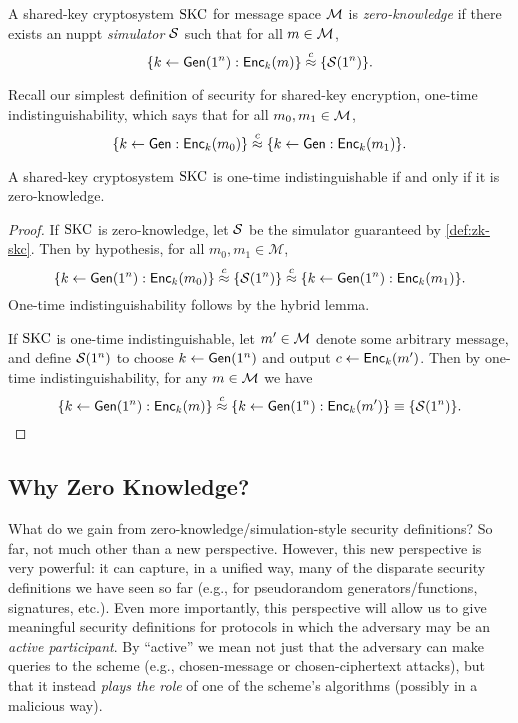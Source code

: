 \documentclass[11pt]{article}
\begin{document}
\begin{definition}
  \label{def:zk-skc}
  A shared-key cryptosystem $\text{SKC}$ for message space $\mathcal{M}$ is
  \emph{zero-knowledge} if there exists an nuppt \emph{simulator}
  $\mathcal{S}$ such that for all $m \in \mathcal{M}$, \[ \{k \gets
    \mathsf{Gen}(1^{n}) : \mathsf{Enc}_{k}(m)\} \stackrel{c}{\approx} \{\mathcal{S}(1^{n})\}. \]
\end{definition}

Recall our simplest definition of security for shared-key encryption,
one-time indistinguishability, which says that for all $m_{0}, m_{1}
\in \mathcal{M}$, \[ \{k \gets \mathsf{Gen} : \mathsf{Enc}_{k}(m_{0})\} \stackrel{c}{\approx}
\{k \gets \mathsf{Gen} : \mathsf{Enc}_{k}(m_{1})\}. \]

\begin{theorem}
  \label{thm:zk-iff-indist}
  A shared-key cryptosystem $\text{SKC}$ is one-time indistinguishable if
  and only if it is zero-knowledge.
\end{theorem}

\begin{proof}
  If $\text{SKC}$ is zero-knowledge, let $\mathcal{S}$ be the simulator guaranteed
  by \cref{def:zk-skc}.  Then by hypothesis, for all $m_{0},
  m_{1} \in \mathcal{M}$,
  \[ \{k \gets \mathsf{Gen}(1^{n}): \mathsf{Enc}_{k}(m_0)\} \stackrel{c}{\approx}
  \{\mathcal{S}(1^{n})\} \stackrel{c}{\approx} \{k \gets \mathsf{Gen}(1^{n}) :
    \mathsf{Enc}_{k}(m_1)\}. \] One-time indistinguishability follows by the
  hybrid lemma.

  If $\text{SKC}$ is one-time indistinguishable, let $m' \in \mathcal{M}$
  denote some arbitrary message, and define $\mathcal{S}(1^{n})$ to choose $k
  \gets \mathsf{Gen}(1^{n})$ and output $c \gets \mathsf{Enc}_{k}(m')$.  Then by
  one-time indistinguishability, for any $m \in \mathcal{M}$ we have
  \[ \{k \gets \mathsf{Gen}(1^{n}): \mathsf{Enc}_{k}(m)\} \stackrel{c}{\approx} \{k
    \gets \mathsf{Gen}(1^{n}) : \mathsf{Enc}_{k}(m')\} \equiv
  \{\mathcal{S}(1^{n})\}. \]
\end{proof}

\subsection{Why Zero Knowledge?}
\label{sec:why-zero-knowledge}

What do we gain from zero-knowledge/simulation-style security
definitions?  So far, not much other than a new perspective.  However,
this new perspective is very powerful: it can capture, in a unified
way, many of the disparate security definitions we have seen so far
(e.g., for pseudorandom generators/functions, signatures, etc.).  Even
more importantly, this perspective will allow us to give meaningful
security definitions for protocols in which the adversary may be an
\emph{active participant}.  By ``active'' we mean not just that the
adversary can make queries to the scheme (e.g., chosen-message or
chosen-ciphertext attacks), but that it instead \emph{plays the role}
of one of the scheme's algorithms (possibly in a malicious way).
\end{document}
